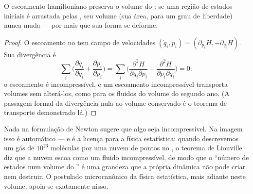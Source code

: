\begin{theorem}\label{thm:b3:hamiltonian-mechanics:liouville}
O escoamento hamiltoniano preserva o volume do : se uma
região de estados iniciais é arrastada pelas , seu
volume (sua área, para um grau de liberdade) nunca muda --- por mais
que sua forma se deforme.
\end{theorem}

\begin{proof}
O escoamento no  tem campo de velocidades $(\dot q_i, \dot p_i) =
(\partial_{p_i}H, -\partial_{q_i}H)$. Sua divergência é
\[
\sum_i\Big(\frac{\partial\dot q_i}{\partial q_i}
 + \frac{\partial\dot p_i}{\partial p_i}\Big)
 = \sum_i\Big(\frac{\partial^2H}{\partial q_i\partial p_i}
 - \frac{\partial^2H}{\partial p_i\partial q_i}\Big) = 0 :
\]
o escoamento é incompressível, e um escoamento incompressível
transporta volumes sem alterá-los, como para os fluidos do volume do
segundo ano. (A passagem formal da divergência nula ao volume
conservado é o teorema de transporte demonstrado lá.)
\end{proof}

\begin{remark}\label{rem:b3:hamiltonian-mechanics:liouville-matters}
Nada na formulação de Newton sugere que algo seja incompressível. Na
imagem  isso é automático --- e é a licença para a física
estatística: quando descrevemos um gás de $10^{23}$ moléculas por uma
nuvem de pontos no , o teorema de Liouville diz que a
nuvem escoa como um fluido incompressível, de modo que o ``número de
estados num volume do '' é uma grandeza que a própria
dinâmica não pode criar nem destruir. O postulado microcanônico da
física estatística, mais adiante neste volume, apoia-se exatamente
nisso.
\end{remark}


